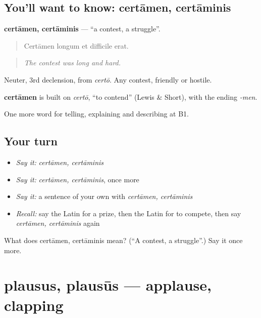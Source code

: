 \subsection*{You'll want to know: certāmen, certāminis}
\textbf{certāmen, certāminis} — \textquotedblleft{}a contest, a struggle\textquotedblright{}.

\begin{quote}
Certāmen longum et difficile erat.
\end{quote}

\begin{quote}
\emph{The contest was long and hard.}
\end{quote}

Neuter, 3rd declension, from \emph{certō}. Any contest, friendly or hostile.

\begin{cousinweb}
\textbf{certāmen} is built on \emph{certō}, \textquotedblleft{}to contend\textquotedblright{} (Lewis \& Short), with the ending \emph{-men}.
\end{cousinweb}

\begin{grammarlens}[title={What you've built}]
One more word for telling, explaining and describing at B1.
\end{grammarlens}

\subsection*{Your turn}
\begin{itemize}
\raggedright
  \item \emph{Say it:} \emph{certāmen, certāminis}
  \item \emph{Say it:} \emph{certāmen, certāminis}, once more
  \item \emph{Say it:} a sentence of your own with \emph{certāmen, certāminis}
  \item \emph{Recall:} say the Latin for a prize, then the Latin for to compete, then say \emph{certāmen, certāminis} again
\end{itemize}

\begin{tcolorbox}[breakable,colback=teal!4,colframe=teal!35!black,title={Before you move on}]
What does certāmen, certāminis mean? (\textquotedblleft{}A contest, a struggle\textquotedblright{}.) Say it once more.
\end{tcolorbox}
\section[plausus, plausūs]{plausus, plausūs — applause, clapping}

